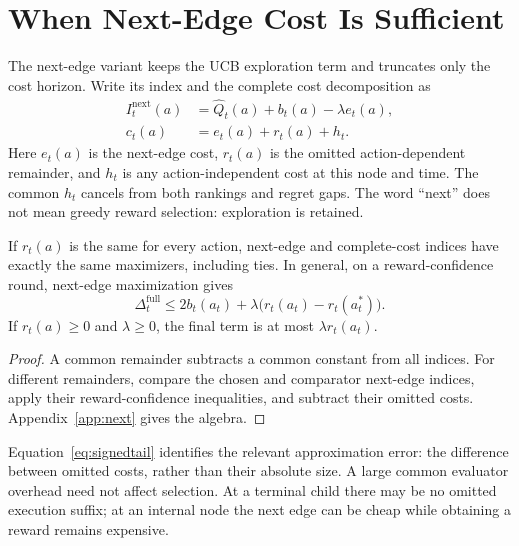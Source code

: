 \section{When Next-Edge Cost Is Sufficient}
\label{sec:next}
The next-edge variant keeps the UCB exploration term and truncates only the cost horizon. Write its index and the complete cost decomposition as
\begin{equation}
\begin{split}
I_t^{\mathrm{next}}(a)&=\widehat Q_t(a)+b_t(a)-\lambda e_t(a),\\
c_t(a)&=e_t(a)+r_t(a)+h_t.
\end{split}
\label{eq:next}
\end{equation}
Here $e_t(a)$ is the next-edge cost, $r_t(a)$ is the omitted action-dependent remainder, and $h_t$ is any action-independent cost at this node and time. The common $h_t$ cancels from both rankings and regret gaps. The word ``next'' does not mean greedy reward selection: exploration is retained.

\begin{proposition}
\label{prop:next}
If $r_t(a)$ is the same for every action, next-edge and complete-cost indices have exactly the same maximizers, including ties. In general, on a reward-confidence round, next-edge maximization gives
\begin{equation}
\Delta_t^{\mathrm{full}}
\le 2b_t(a_t)+\lambda\bigl(r_t(a_t)-r_t(a_t^*)\bigr).
\label{eq:signedtail}
\end{equation}
If $r_t(a)\ge0$ and $\lambda\ge0$, the final term is at most $\lambda r_t(a_t)$.
\end{proposition}
\begin{proof}
A common remainder subtracts a common constant from all indices. For different remainders, compare the chosen and comparator next-edge indices, apply their reward-confidence inequalities, and subtract their omitted costs. Appendix~\ref{app:next} gives the algebra.
\end{proof}

Equation~\eqref{eq:signedtail} identifies the relevant approximation error: the difference between omitted costs, rather than their absolute size. A large common evaluator overhead need not affect selection. At a terminal child there may be no omitted execution suffix; at an internal node the next edge can be cheap while obtaining a reward remains expensive.


